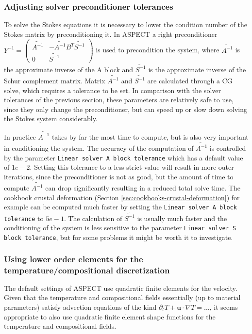 \documentclass{article}
\newcommand{\aspect}{\textsc{ASPECT}}
\begin{document}
\subsubsection{Adjusting solver preconditioner tolerances} To solve the Stokes
equations it is necessary to lower the condition number of the
Stokes matrix by preconditioning  it. In \aspect{} a right preconditioner $Y^{-1} =
\begin{pmatrix}
\widetilde{A^{-1}} & -\widetilde{A^{-1}}B^{T}\widetilde{S^{-1}} \\
0 & \widetilde{S^{-1}}
\end{pmatrix}$ is used to precondition the system, where $\widetilde{A^{-1}}$ is
the approximate inverse of the A block and $\widetilde{S^{-1}}$ is the approximate
inverse of the Schur complement matrix. Matrix $\widetilde{A^{-1}}$ and
$\widetilde{S^{-1}}$ are calculated through a CG solve, which requires a tolerance
to be set. In comparison with the solver tolerances of the previous section, these
parameters are relatively safe to use, since they only change the preconditioner,
but can speed up or slow down solving the Stokes system considerably.

In practice $\widetilde{A^{-1}}$ takes by far the most time to compute, but is
also very important in conditioning the system. The accuracy of the computation
of $\widetilde{A^{-1}}$ is controlled by the parameter \texttt{Linear solver A
block tolerance} which has a default value of $1e-2$. Setting this tolerance
to a less strict value will result in more outer iterations, since the
preconditioner is not as good, but the amount of time to compute
$\widetilde{A^{-1}}$ can drop significantly resulting in a reduced total solve
time. The cookbook crustal deformation (Section
\ref{sec:cookbooks-crustal-deformation}) for example can be computed much faster
by setting the \texttt{Linear solver A block tolerance} to $5e-1$. The
calculation of $\widetilde{S^{-1}}$ is usually much faster and the
conditioning of the system is less sensitive to the parameter \texttt{Linear
solver S block tolerance}, but for some problems it might be worth it to
investigate.

\subsubsection{Using lower order elements for the temperature/compositional discretization}
The default settings of \aspect{} use quadratic finite elements for the
velocity. Given that the temperature and compositional fields essentially (up
to material parameters) satisfy advection equations of the kind $\partial_t T +
\mathbf u \cdot \nabla T = \ldots$, it seems appropriate to also use quadratic
finite element shape functions for the temperature and compositional fields.
\end{document}
